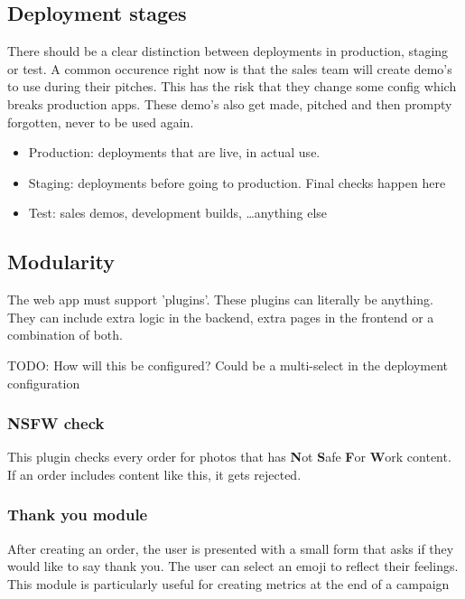 \subsection{Deployment stages}

There should be a clear distinction between deployments in production, staging or test. 
A common occurence right now is that the sales team will create demo's to use during their pitches. This has the risk that they change some config which breaks production apps. These demo's also get made, pitched and then prompty forgotten, never to be used again.

\begin{itemize}
	\item Production: deployments that are live, in actual use.
	\item Staging: deployments before going to production. Final checks happen here
	\item Test: sales demos, development builds, \dots anything else
\end{itemize}

\subsection{Modularity}

The web app must support 'plugins'. These plugins can literally be anything. They can include extra logic in the backend, extra pages in the frontend or a combination of both.

TODO: How will this be configured? Could be a multi-select in the deployment configuration

\subsubsection{NSFW check}

This plugin checks every order for photos that has \textbf{N}ot \textbf{S}afe \textbf{F}or \textbf{W}ork content. If an order includes content like this, it gets rejected.

\subsubsection{Thank you module}

After creating an order, the user is presented with a small form that asks if they would like to say thank you. The user can select an emoji to reflect their feelings. 
This module is particularly useful for creating metrics at the end of a campaign

